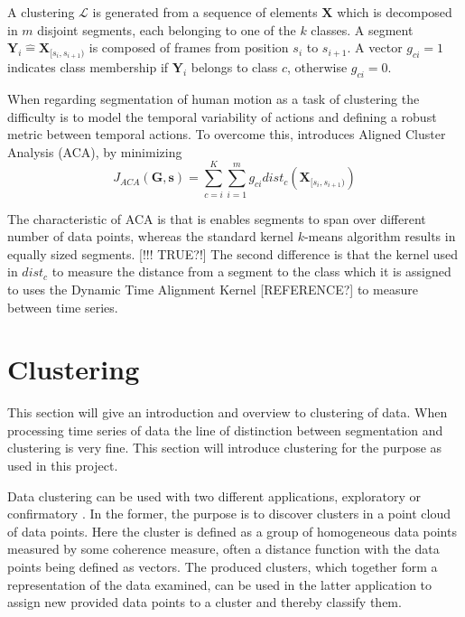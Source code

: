 A clustering $\mathcal{L}$ is generated from a sequence of elements 
$\mathbf{X}$ which is decomposed in $m$ disjoint segments, each belonging to 
one of the $k$ classes. A segment $\mathbf{Y}_i \hat{=} 
\mathbf{X}_{[s_i,s_{i+1})}$ is composed of frames from position $s_i$ to 
$s_{i+1}$. A vector $g_{ci} = 1$ indicates class membership if $\mathbf{Y}_i$ 
belongs to class $c$, otherwise $g_{ci} = 0$.

When regarding segmentation of human motion as a task of clustering the 
difficulty is to model the temporal variability of actions 
and defining a robust metric between temporal actions. To overcome this, 
\cite{zhou2008aligned} introduces Aligned Cluster Analysis (ACA), by minimizing
\begin{equation} \label{eq:ACA}
J_{\mathit{ACA}}(\mathbf{G},\mathbf{s}) = 
\sum_{c=i}^{K} \sum_{i=1}^{m} g_{ci} \mathit{dist}_c 
(\mathbf{X}_{[s_i,s_{i+1})})
\end{equation}

The characteristic of ACA is that is enables segments to span over different 
number of data points, whereas the standard kernel $k$-means algorithm results 
in equally sized segments. [!!! TRUE?!] The second difference is that the 
kernel used in $\mathit{dist}_c$ to measure the distance from a segment to the 
class which it is assigned to uses the Dynamic Time Alignment Kernel 
[REFERENCE?] to measure between time series.


\section{Clustering}

This section will give an introduction and overview to clustering of data. 
When processing time series of data the line of distinction between 
segmentation and clustering is very fine. This section will introduce 
clustering for the purpose as used in this project.

Data clustering can be used with two different applications, exploratory or 
confirmatory \cite{jain1999data}. In the former, the purpose is to discover 
clusters in a point cloud of data points. Here the cluster is defined as a 
group of homogeneous data points measured by some coherence measure, often a 
distance function with the data points being defined as vectors. The produced 
clusters, which together form a representation of the data examined, can be 
used in the 
latter application to assign new provided data points to a cluster and thereby 
classify them.

